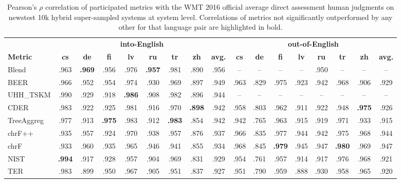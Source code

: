 \begin{landscape} 
\begin{table}

\caption{
    Pearson's $\rho $ correlation of participated metrics with the WMT 2016 official average direct assessment human judgments on newstest 10k hybrid super-sampled systems at system level.
    Correlations of metrics not significantly outperformed by any other for that language pair are highlighted in bold.
}

\centering
\begin{tabular}{m{}cccccccc|cccccccc}
\hline & \multicolumn{8}{c|}{\textbf{into-English}} & \multicolumn{8}{c}{\textbf{out-of-English}} \\\textbf{Metric} & \textbf{cs} & \textbf{de} & \textbf{fi} & \textbf{lv} & \textbf{ru} & \textbf{tr} & \textbf{zh} & \textbf{avg.} & \textbf{cs} & \textbf{de} & \textbf{fi} & \textbf{lv} & \textbf{ru} & \textbf{tr} & \textbf{zh} & \textbf{avg.} \\ \hline
Blend  & .963 & \textbf{.969} & .956 & .976 & \textbf{.957} & .981 & .890 & .956 & -- & -- & -- & -- & .950 & -- & -- & -- \\ \hline
BEER & .966 & .952 & .954 & .974 & .930 & .969 & .897 & .949 & .963 & .829 & .975 & .923 & .942 & .968 & .906 & .929 \\ \hline
UHH\_TSKM & .990 & .929 & .918 & \textbf{.986} & .908 & .982  & .896  & .944  & --  & --  & --  & --  & --  & --  & --  & --  \\ \hline
CDER & .983  & .922  & .925  & .981  & .916  & .970  & \textbf{.898 } & .942  & .958  & .803  & .962  & .911  & .922  & .948  & \textbf{.975 } & .926  \\ \hline
TreeAggreg & .977  & .913  & \textbf{.975} & .983  & .912  & \textbf{.983 } & .854  & .942  & .942  & .765  & .963  & .915  & .919  & .971  & .933  & .915  \\ \hline
chrF++ & .935  & .957  & .924  & .970  & .938  & .957  & .876  & .937  & .966  & .835  & .977  & .944  & .942  & .975  & .968  & .944  \\ \hline
chrF & .933  & .960  & .935  & .965  & .946  & .941  & .855  & .934  & .968  & .845  & \textbf{.979 } & .945  & .947  & \textbf{.980 } & .969  & .947  \\ \hline
NIST & \textbf{.994} & .917  & .928  & .957  & .904  & .969  & .831  & .929  & .954  & .761  & .957  & .914  & .917  & .976  & .968  & .921  \\ \hline
TER & .983  & .899  & .950  & .967  & .905  & .951  & .837  & .927  & .951  & .790  & .959 & .888 & .930 & .958 & .965 & .920 \\ \hline

\end{tabular}
\end{table}
\end{landscape}
